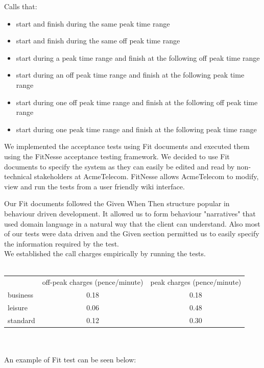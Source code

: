 \documentclass[a4paper,11pt]{article}
\begin{document}
Calls that:
\begin{itemize}
\item start and finish during the same peak time range
\item start and finish during the same off peak time range
\item start during a peak time range and finish at the following off peak time range
\item start during an off peak time range and finish at the following peak time range
\item start during one off peak time range and finish at the following off peak time range
\item start during one peak time range and finish at the following peak time range
\end{itemize}

We implemented the acceptance tests using Fit documents and executed them using the FitNesse acceptance testing framework. We decided to use Fit documents to specify the system as they can easily be edited and read by non-technical stakeholders at AcmeTelecom. FitNesse allows AcmeTelecom to modify, view and run the tests from a user friendly wiki interface. 

Our Fit documents followed the Given When Then structure popular in behaviour driven development. It allowed us to form behaviour "narratives" that used domain language in a natural way that the client can understand. Also most of our tests were data driven and the Given section permitted us to easily specify the information required by the test.  
\\

We established the call charges empirically by running the tests.
\\\\
\begin{tabular}{ l c c }
&				off-peak charges (pence/minute) &  peak charges (pence/minute) \\
business &		0.18&								0.18 \\
leisure & 		0.06& 								0.48 \\
standard & 		0.12&								0.30 \\
\end{tabular}
\\\\


An example of Fit test can be seen below:
\end{document}
